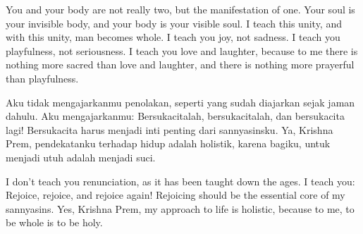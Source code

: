 \english
You and your body are not really two, but the manifestation of one. Your soul is your invisible body, and your body is your visible soul. I teach this unity, and with this unity, man becomes whole. I teach you joy, not sadness. I teach you playfulness, not seriousness. I teach you love and laughter, because to me there is nothing more sacred than love and laughter, and there is nothing more prayerful than playfulness.

\bahasa
Aku tidak mengajarkanmu penolakan, seperti yang sudah diajarkan sejak jaman dahulu. Aku mengajarkanmu: Bersukacitalah, bersukacitalah, dan bersukacita lagi! Bersukacita harus menjadi inti penting dari sannyasinsku. Ya, Krishna Prem, pendekatanku terhadap hidup adalah holistik, karena bagiku, untuk menjadi utuh adalah menjadi suci.

\english
I don't teach you renunciation, as it has been taught down the ages. I teach you: Rejoice, rejoice, and rejoice again! Rejoicing should be the essential core of my sannyasins. Yes, Krishna Prem, my approach to life is holistic, because to me, to be whole is to be holy.

